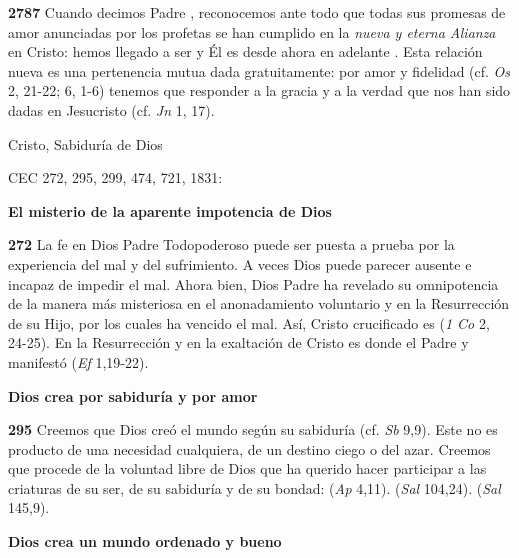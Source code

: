 \textbf{2787} Cuando decimos Padre , reconocemos ante todo que todas sus promesas de amor anunciadas por los profetas se han cumplido en la \emph{nueva y eterna Alianza} en Cristo: hemos llegado a ser  y Él es desde ahora en adelante . Esta relación nueva es una pertenencia mutua dada gratuitamente: por amor y fidelidad (cf. \emph{Os} 2, 21-22; 6, 1-6) tenemos que responder a la gracia y a la verdad que nos han sido dadas en Jesucristo (cf. \emph{Jn} 1, 17).

Cristo, Sabiduría de Dios

CEC 272, 295, 299, 474, 721, 1831:

\textbf{El misterio de la aparente impotencia de Dios}

\textbf{272} La fe en Dios Padre Todopoderoso puede ser puesta a prueba por la experiencia del mal y del sufrimiento. A veces Dios puede parecer ausente e incapaz de impedir el mal. Ahora bien, Dios Padre ha revelado su omnipotencia de la manera más misteriosa en el anonadamiento voluntario y en la Resurrección de su Hijo, por los cuales ha vencido el mal. Así, Cristo crucificado es  (\emph{1 Co} 2, 24-25). En la Resurrección y en la exaltación de Cristo es donde el Padre  y manifestó  (\emph{Ef} 1,19-22).

\textbf{Dios crea por sabiduría y por amor}

\textbf{295} Creemos que Dios creó el mundo según su sabiduría (cf. \emph{Sb} 9,9). Este no es producto de una necesidad cualquiera, de un destino ciego o del azar. Creemos que procede de la voluntad libre de Dios que ha querido hacer participar a las criaturas de su ser, de su sabiduría y de su bondad:  (\emph{Ap} 4,11).  (\emph{Sal} 104,24).  (\emph{Sal} 145,9).

\textbf{Dios crea un mundo ordenado y bueno}

